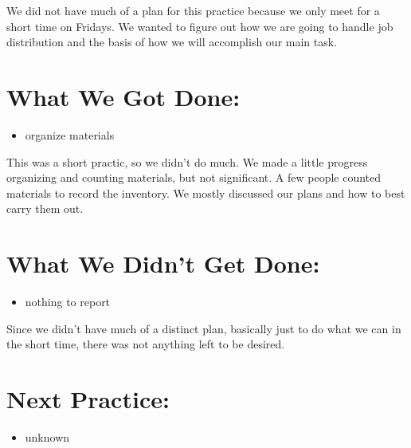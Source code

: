\documentclass[12pt]{article}
\begin{document}
We did not have much of a plan for this practice because we only meet for a short time on Fridays. We wanted to figure out how we are going to handle job distribution and the basis of how we will accomplish our main task.

\section{What We Got Done:} %
\begin{itemize}
	\item organize materials	
\end{itemize}

This was a short practic, so we didn’t do much. We made a little progress organizing and counting materials, but not significant. A few people counted materials to record the inventory. We mostly discussed our plans and how to best carry them out.

\section{What We Didn't Get Done:} %
\begin{itemize}
	\item nothing to report
\end{itemize}

Since we didn’t have much of a distinct plan, basically just to do what we can in the short time, there was not anything left to be desired. 

\section{Next Practice:}
\begin{itemize}
	\item unknown
\end{itemize}
\end{document}
